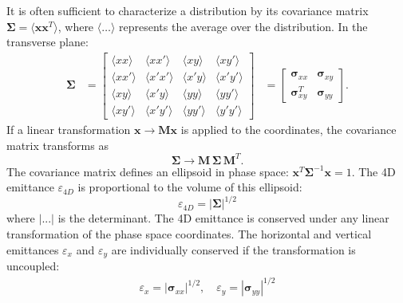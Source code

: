 It is often sufficient to characterize a distribution by its covariance matrix {$\bm{\Sigma} = \langle{\mathbf{x}\mathbf{x}^T}\rangle$}, where $\langle{\dots}\rangle$ represents the average over the distribution. In the transverse plane:
%
\begin{equation}\label{eq:covariance_matrix}
\begin{aligned}
    \bm{\Sigma} &= 
    \begin{bmatrix}
        \langle{xx}\rangle & \langle{xx'}\rangle & \langle{xy}\rangle & \langle{xy'}\rangle \\
        \langle{xx'}\rangle & \langle{x'x'}\rangle & \langle{x'y}\rangle & \langle{x'y'}\rangle \\
        \langle{xy}\rangle & \langle{x'y}\rangle & \langle{yy}\rangle & \langle{yy'}\rangle \\
        \langle{xy'}\rangle & \langle{x'y'}\rangle & \langle{yy'}\rangle & \langle{y'y'}\rangle 
    \end{bmatrix}
    &= 
    \begin{bmatrix}
        \bm{\sigma}_{xx} & \bm{\sigma}_{xy} \\
        \bm{\sigma}^T_{xy} & \bm{\sigma}_{yy}
    \end{bmatrix}.
\end{aligned}
\end{equation}
%
If a linear transformation $\mathbf{x} \rightarrow \mathbf{M}\mathbf{x}$ is applied to the coordinates, the covariance matrix transforms as
%
\begin{equation}\label{covariance_matrix_transport}
    \bm{\Sigma} 
    \rightarrow 
    \mathbf{M} \, \bm{\Sigma} \, \mathbf{M}^T.
\end{equation}
%
The covariance matrix defines an ellipsoid in phase space: $\mathbf{x}^T \bm{\Sigma}^{-1} \mathbf{x} = 1$. The 4D emittance $\varepsilon_{4D}$ is proportional to the volume of this ellipsoid:
%
\begin{equation} 
    \varepsilon_{4D} = \left|{\bm{\Sigma}}\right|^{1/2}
\end{equation}
%
where $|...|$ is the determinant. The 4D emittance is conserved under any linear transformation of the phase space coordinates. The horizontal and vertical emittances $\varepsilon_x$ and $\varepsilon_y$ are individually conserved if the transformation is uncoupled:
%
\begin{equation}
\begin{aligned}
    \varepsilon_x = \left|{\bm\sigma}_{xx}\right|^{1/2}, \quad
    \varepsilon_y = \left|{\bm\sigma}_{yy}\right|^{1/2}
\end{aligned}
\end{equation}

